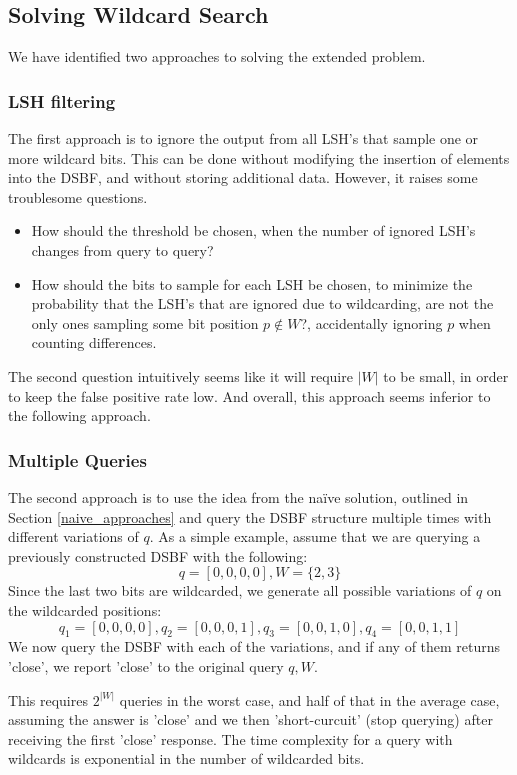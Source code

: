 \documentclass[a4paper,11pt]{article}
\begin{document}
\subsection{Solving Wildcard Search}
We have identified two approaches to solving the extended problem.
\subsubsection*{LSH filtering}
 The first approach is to ignore the output from all LSH's that sample one or more wildcard bits. This can be done without modifying the insertion of elements into the DSBF, and without storing additional data. However, it raises some troublesome questions.

\begin{itemize}
\item How should the threshold be chosen, when the number of ignored LSH's changes from query to query?
\item How should the bits to sample for each LSH be chosen, to minimize the probability that the LSH's that are ignored due to wildcarding, are not the only ones sampling some bit position $p \notin W$?, accidentally ignoring $p$ when counting differences.
\end{itemize}

The second question intuitively seems like it will require $|W|$ to be small, in order to keep the false positive rate low. And overall, this approach seems inferior to the following approach.

\subsubsection*{Multiple Queries}
The second approach is to use the idea from the naïve solution, outlined in Section \ref{naive_approaches} and query the DSBF structure multiple times with different variations of $q$. As a simple example, assume that we are querying a previously constructed DSBF with the following:
\[q=[0,0,0,0], W=\{2,3\}\]
Since the last two bits are wildcarded, we generate all possible variations of $q$ on the wildcarded positions:
\[q_1=[0,0,0,0], q_2=[0,0,0,1], q_3=[0,0,1,0], q_4=[0,0,1,1]\]
We now query the DSBF with each of the variations, and if any of them returns 'close', we report 'close' to the original query $q, W$.

This requires $2^{|W|}$ queries in the worst case, and half of that in the average case, assuming the answer is 'close' and we then 'short-curcuit' (stop querying) after receiving the first 'close' response. The time complexity for a query with wildcards is exponential in the number of wildcarded bits.\\
\end{document}
